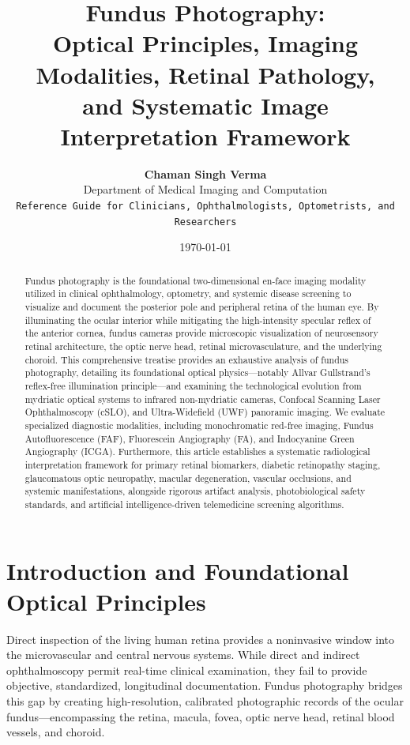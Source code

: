 \documentclass[11pt,a4paper]{article}
\title{\textbf{\huge Fundus Photography:}\\[0.3em]
\Large Optical Principles, Imaging Modalities, Retinal Pathology,\\
and Systematic Image Interpretation Framework}
\author{\textbf{Chaman Singh Verma}\\[0.2em]
\small Department of Medical Imaging and Computation\\
\small \texttt{Reference Guide for Clinicians, Ophthalmologists, Optometrists, and Researchers}}
\date{\today}
\begin{document}
\maketitle

\begin{abstract}
Fundus photography is the foundational two-dimensional en-face imaging modality utilized in clinical ophthalmology, optometry, and systemic disease screening to visualize and document the posterior pole and peripheral retina of the human eye. By illuminating the ocular interior while mitigating the high-intensity specular reflex of the anterior cornea, fundus cameras provide microscopic visualization of neurosensory retinal architecture, the optic nerve head, retinal microvasculature, and the underlying choroid. This comprehensive treatise provides an exhaustive analysis of fundus photography, detailing its foundational optical physics—notably Allvar Gullstrand's reflex-free illumination principle—and examining the technological evolution from mydriatic optical systems to infrared non-mydriatic cameras, Confocal Scanning Laser Ophthalmoscopy (cSLO), and Ultra-Widefield (UWF) panoramic imaging. We evaluate specialized diagnostic modalities, including monochromatic red-free imaging, Fundus Autofluorescence (FAF), Fluorescein Angiography (FA), and Indocyanine Green Angiography (ICGA). Furthermore, this article establishes a systematic radiological interpretation framework for primary retinal biomarkers, diabetic retinopathy staging, glaucomatous optic neuropathy, macular degeneration, vascular occlusions, and systemic manifestations, alongside rigorous artifact analysis, photobiological safety standards, and artificial intelligence-driven telemedicine screening algorithms.
\end{abstract}

\tableofcontents
\newpage

\section{Introduction and Foundational Optical Principles}

Direct inspection of the living human retina provides a noninvasive window into the microvascular and central nervous systems. While direct and indirect ophthalmoscopy permit real-time clinical examination, they fail to provide objective, standardized, longitudinal documentation. Fundus photography bridges this gap by creating high-resolution, calibrated photographic records of the ocular fundus—encompassing the retina, macula, fovea, optic nerve head, retinal blood vessels, and choroid.
\end{document}
